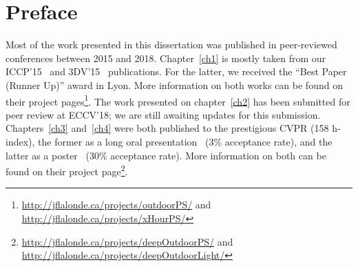 \chapter*{Preface}         %

Most of the work presented in this dissertation was published in peer-reviewed conferences between 2015 and 2018. %
Chapter~\ref{ch1} is mostly taken from our ICCP'15~\cite{holdgeoffroy-iccp-15} and 3DV'15~\cite{holdgeoffroy-3dv-15} publications. For the latter, we received the ``Best Paper (Runner Up)'' award in Lyon. More information on both works can be found on their project pages\footnote{\url{http://jflalonde.ca/projects/outdoorPS/} and \url{http://jflalonde.ca/projects/xHourPS/}}. The work presented on chapter~\ref{ch2} has been submitted for peer review at ECCV'18; we are still awaiting updates for this submission. Chapters~\ref{ch3} and~\ref{ch4} were both published to the prestigious CVPR (158 h-index), the former as a long oral presentation~\cite{holdgeoffroy-cvpr-17} (3\% acceptance rate), and the latter as a poster~\cite{holdgeoffroy-cvpr-18} (30\% acceptance rate). More information on both can be found on their project page\footnote{\url{http://jflalonde.ca/projects/deepOutdoorPS/} and\\ \url{http://jflalonde.ca/projects/deepOutdoorLight/}}.


%
%

